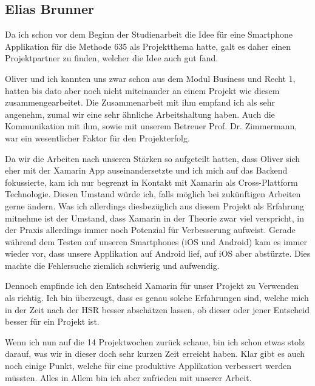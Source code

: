 \subsection{Elias Brunner}
Da ich schon vor dem Beginn der Studienarbeit die Idee für eine Smartphone Applikation für die Methode 635 als Projektthema hatte, galt es daher einen Projektpartner zu finden, welcher die Idee auch gut fand. 

Oliver und ich kannten uns zwar schon aus dem Modul Business und Recht 1, hatten bis dato aber noch nicht miteinander an einem Projekt wie diesem zusammengearbeitet. Die Zusammenarbeit mit ihm empfand ich als sehr angenehm, zumal wir eine sehr ähnliche Arbeitshaltung haben. Auch die Kommunikation mit ihm, sowie mit unserem Betreuer Prof. Dr. Zimmermann, war ein wesentlicher Faktor für den Projekterfolg.

Da wir die Arbeiten nach unseren Stärken so aufgeteilt hatten, dass Oliver sich eher mit der Xamarin App auseinandersetzte und ich mich auf das Backend fokussierte, kam ich nur begrenzt in Kontakt mit Xamarin als Cross-Plattform Technologie. Diesen Umstand würde ich, falls möglich bei zukünftigen Arbeiten gerne ändern. Was ich allerdings diesbezüglich aus diesem Projekt als Erfahrung mitnehme ist der Umstand, dass Xamarin in der Theorie zwar viel verspricht, in der Praxis allerdings immer noch Potenzial für Verbesserung aufweist. Gerade während dem Testen auf unseren Smartphones (iOS und Android) kam es immer wieder vor, dass unsere Applikation auf Android lief, auf iOS aber abstürzte. Dies machte die Fehlersuche ziemlich schwierig und aufwendig.

Dennoch empfinde ich den Entscheid Xamarin für unser Projekt zu Verwenden als richtig. Ich bin überzeugt, dass es genau solche Erfahrungen sind, welche mich in der Zeit nach der HSR besser abschätzen lassen, ob dieser oder jener Entscheid besser für ein Projekt ist. 

Wenn ich nun auf die 14 Projektwochen zurück schaue, bin ich schon etwas stolz darauf, was wir in dieser doch sehr kurzen Zeit erreicht haben. Klar gibt es auch noch einige Punkt, welche für eine \grqq produktive\grqq{} Applikation  verbessert werden müssten. Alles in Allem bin ich aber zufrieden mit unserer Arbeit.


